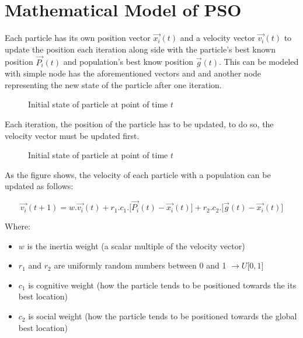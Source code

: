 \section{Mathematical Model of PSO}

Each particle has its own position vector
{\(\overset{\rightarrow}{x_{i}}(t)\)} and a velocity vector
{\(\overset{\rightarrow}{v_{i}}(t)\)} to update the position each
iteration along side with the particle's best known position
{\(\overset{\rightarrow}{P_{i}}(t)\)} and population's best know
position {\(\overset{\rightarrow}{g}(t)\)}. This can be modeled with
simple node has the aforementioned vectors and and another node
representing the new state of the particle after one iteration.

    \begin{figure}[htbp]
        \centering
        \scalebox{.8}{}
        \caption{Initial state of particle at point of time $t$ }
        \label{fig:label}
    \end{figure}
    


Each iteration, the position of the particle has to be updated, to do
so, the velocity vector must be updated first.\\
    \begin{figure}[htbp]
        \centering
        \scalebox{.7}{}
        \caption{Initial state of particle at point of time $t$ }
        \label{fig:label}
    \end{figure}
    
As the figure shows, the velocity of each particle with a population can
be updated as follows:

\[\overset{\rightarrow}{v_{i}}(t + 1) = w.\overset{\rightarrow}{v_{i}}(t) + r_{1}.c_{1}.\lbrack\overset{\rightarrow}{P_{i}}(t) - \overset{\rightarrow}{x_{i}}(t)\rbrack + r_{2}.c_{2}.\lbrack\overset{\rightarrow}{g}(t) - \overset{\rightarrow}{x_{i}}(t)\rbrack\]

Where:

\begin{itemize}
\item
  {\(w\)} is the inertia weight (a scalar multiple of the velocity
  vector)
\item
  {\(r_{1}\)} and {\(r_{2}\)} are uniformly random numbers between 0 and
  1 {\(\rightarrow U\lbrack 0,1\rbrack\)}
\item
  {\(c_{1}\)} is cognitive weight (how the particle tends to be
  positioned towards the its best location)
\item
  {\(c_{2}\)} is social weight (how the particle tends to be positioned
  towards the global best location)
\end{itemize}

